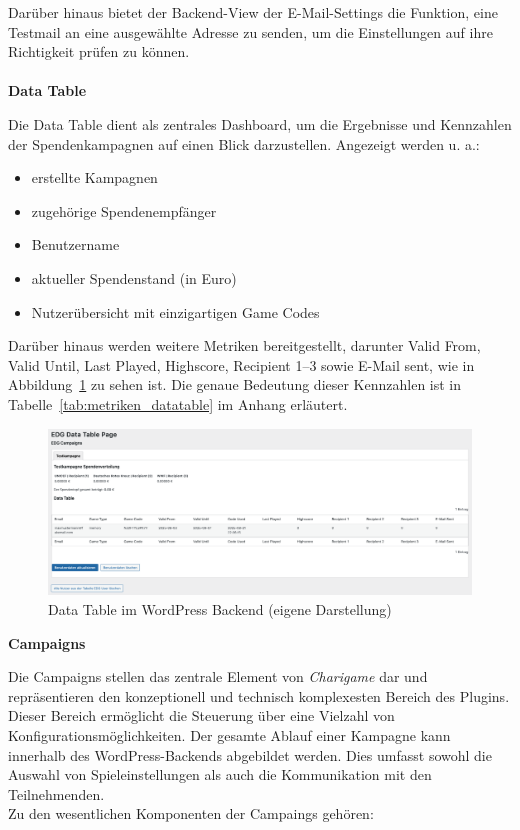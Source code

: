 Darüber hinaus bietet der Backend-View der E-Mail-Settings die Funktion, eine Testmail an eine ausgewählte Adresse zu senden, um die Einstellungen auf ihre Richtigkeit prüfen zu können.
\\\\
\textbf{Data Table}

Die Data Table dient als zentrales Dashboard, um die Ergebnisse und Kennzahlen der Spendenkampagnen auf einen Blick darzustellen.
Angezeigt werden u. a.:
\begin{itemize}
    \item erstellte Kampagnen
    \item zugehörige Spendenempfänger
    \item Benutzername
    \item aktueller Spendenstand (in Euro)
    \item Nutzerübersicht mit einzigartigen Game Codes
\end{itemize}
Darüber hinaus werden weitere Metriken bereitgestellt, darunter Valid From, Valid Until, Last Played, Highscore, Recipient 1–3 sowie E-Mail sent, wie in Abbildung~\ref{fig:datatable-backend-legacy} zu sehen ist.
Die genaue Bedeutung dieser Kennzahlen ist in Tabelle~\ref{tab:metriken_datatable} im Anhang erläutert.

\begin{figure}[H]
    \centering
    \includegraphics[width=1\textwidth]{images/legacy_datatable_backend}
    \caption{Data Table im WordPress Backend (eigene Darstellung)}
    \label{fig:datatable-backend-legacy}
\end{figure}

\textbf{Campaigns}

Die Campaigns stellen das zentrale Element von \textit{Charigame} dar und repräsentieren den konzeptionell und technisch komplexesten Bereich des Plugins.
Dieser Bereich ermöglicht die Steuerung über eine Vielzahl von Konfigurationsmöglichkeiten.
Der gesamte Ablauf einer Kampagne kann innerhalb des WordPress-Backends abgebildet werden.
Dies umfasst sowohl die Auswahl von Spieleinstellungen als auch die Kommunikation mit den Teilnehmenden.
\\
Zu den wesentlichen Komponenten der Campaings gehören:

